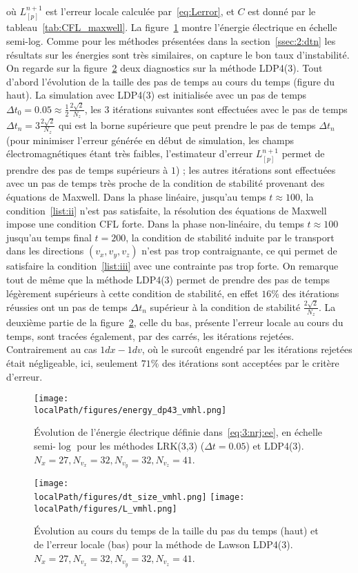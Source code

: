 où $L_{[p]}^{n+1}$ est l'erreur locale calculée par~\ref{eq:Lerror}, et $C$ est donné par le tableau~\ref{tab:CFL_maxwell}. La figure~\ref{fig:energieselecdp43} montre l'énergie électrique en échelle semi-log. Comme pour les méthodes présentées dans la section~\ref{ssec:2:dtn} les résultats sur les énergies sont très similaires, on capture le bon taux d'instabilité. On regarde sur la figure~\ref{fig:dtanderrordp43} deux diagnostics sur la méthode LDP4(3). Tout d'abord l'évolution de la taille des pas de temps au cours du temps (figure du haut). La simulation avec LDP4(3) est initialisée avec un pas de temps $\Delta t_0=0.05\approx\frac{1}{2}\frac{2\sqrt{2}}{N_z}$, les 3 itérations suivantes sont effectuées avec le pas de temps $\Delta t_n=3\frac{2\sqrt{2}}{N_z}$ qui est la borne supérieure que peut prendre le pas de temps $\Delta t_n$ (pour minimiser l'erreur générée en début de simulation, les champs électromagnétiques étant très faibles, l'estimateur d'erreur $L_{[p]}^{n+1}$ permet de prendre des pas de temps supérieurs à $1$) ; les autres itérations sont effectuées avec un pas de temps très proche de la condition de stabilité provenant des équations de Maxwell. Dans la phase linéaire, jusqu'au temps $t\approx 100$, la condition~\ref{list:ii} n'est pas satisfaite, la résolution des équations de Maxwell impose une condition CFL forte. Dans la phase non-linéaire, du temps $t\approx100$ jusqu'au temps final $t=200$, la condition de stabilité induite par le transport dans les directions $(v_x,v_y,v_z)$ n'est pas trop contraignante, ce qui permet de satisfaire la condition~\ref{list:iii} avec une contrainte pas trop forte. On remarque tout de même que la méthode LDP4(3) permet de prendre des pas de temps légèrement supérieurs à cette condition de stabilité, en effet $16\%$ des itérations réussies ont un pas de temps $\Delta t_n$ supérieur à la condition de stabilité $\frac{2\sqrt{2}}{N_z}$. La deuxième partie de la figure~\ref{fig:dtanderrordp43}, celle du bas, présente l'erreur locale au cours du temps, sont tracées également, par des carrés, les itérations rejetées. Contrairement au cas $1dx-1dv$, où le surcoût engendré par les itérations rejetées était négligeable, ici, seulement $71\%$ des itérations sont acceptées par le critère d'erreur.

\begin{figure}[h]
  \centering
  \texttt{[image: \\localPath/figures/energy\_dp43\_vmhl.png]}
  \caption{Évolution de l'énergie électrique définie dans~\eqref{eq:3:nrj:ee}, en échelle semi-$\log$ pour les méthodes LRK(3,3) ($\Delta t = 0.05$) et LDP4(3). $N_x=27, N_{v_x}=32, N_{v_y}=32, N_{v_z}=41$.}
  \label{fig:energieselecdp43}
\end{figure}

\begin{figure}[h]
  \centering
  \texttt{[image: \\localPath/figures/dt\_size\_vmhl.png]}
  \texttt{[image: \\localPath/figures/L\_vmhl.png]}
  \caption{Évolution au cours du temps de la taille du pas du temps (haut) et de l'erreur locale (bas) pour la méthode de Lawson LDP4(3). $N_x=27, N_{v_x}=32, N_{v_y}=32, N_{v_z}=41$.}
  \label{fig:dtanderrordp43}
\end{figure}

